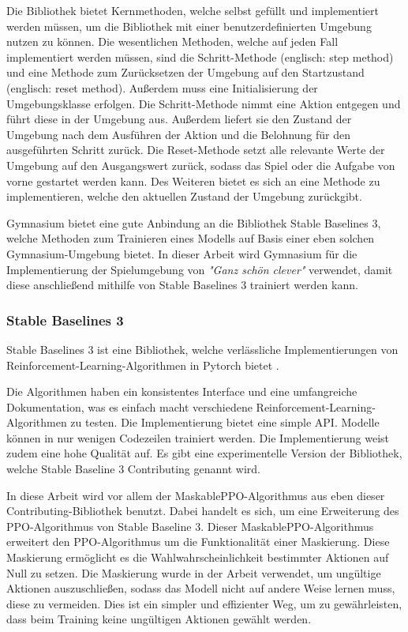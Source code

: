 Die Bibliothek bietet Kernmethoden, welche selbst gefüllt und implementiert werden müssen, um die Bibliothek mit einer benutzerdefinierten Umgebung nutzen zu können. Die wesentlichen Methoden, welche auf jeden Fall implementiert werden müssen, sind die Schritt-Methode (englisch: step method) und eine Methode zum Zurücksetzen der Umgebung auf den Startzustand (englisch: reset method). Außerdem muss eine Initialisierung der Umgebungsklasse erfolgen. Die Schritt-Methode nimmt eine Aktion entgegen und führt diese in der Umgebung aus. Außerdem liefert sie den Zustand der Umgebung nach dem Ausführen der Aktion und die Belohnung für den ausgeführten Schritt zurück. Die Reset-Methode setzt alle relevante Werte der Umgebung auf den Ausgangswert zurück, sodass das Spiel oder die Aufgabe von vorne gestartet werden kann. Des Weiteren bietet es sich an eine Methode zu implementieren, welche den aktuellen Zustand der Umgebung zurückgibt.

Gymnasium bietet eine gute Anbindung an die Bibliothek Stable Baselines 3, welche Methoden zum Trainieren eines Modells auf Basis einer eben solchen Gymnasium-Umgebung bietet. In dieser Arbeit wird Gymnasium für die Implementierung der Spielumgebung von \textit{"Ganz schön clever"} verwendet, damit diese anschließend mithilfe von Stable Baselines 3 trainiert werden kann.

\newpage
\subsubsection{Stable Baselines 3}
Stable Baselines 3 ist eine Bibliothek, welche verlässliche Implementierungen von Reinforcement-Learning-Algorithmen in Pytorch bietet \cite[S. 1]{stable-baselines3}. 

Die Algorithmen haben ein konsistentes Interface und eine umfangreiche Dokumentation, was es einfach macht verschiedene Reinforcement-Learning-Algorithmen zu testen. Die Implementierung bietet eine simple API. Modelle können in nur wenigen Codezeilen trainiert werden. Die Implementierung weist zudem eine hohe Qualität auf. Es gibt eine experimentelle Version der Bibliothek, welche Stable Baseline 3 Contributing genannt wird. \cite[S. 1-3]{stable-baselines3}

In diese Arbeit wird vor allem der MaskablePPO-Algorithmus aus eben dieser Contributing-Bibliothek benutzt. Dabei handelt es sich, um eine Erweiterung des PPO-Algorithmus von Stable Baseline 3. Dieser MaskablePPO-Algorithmus erweitert den PPO-Algorithmus um die Funktionalität einer Maskierung. Diese Maskierung ermöglicht es die Wahlwahrscheinlichkeit bestimmter Aktionen auf Null zu setzen. Die Maskierung wurde in der Arbeit verwendet, um ungültige Aktionen auszuschließen, sodass das Modell nicht auf andere Weise lernen muss, diese zu vermeiden. Dies ist ein simpler und effizienter Weg, um zu gewährleisten, dass beim Training keine ungültigen Aktionen gewählt werden.
